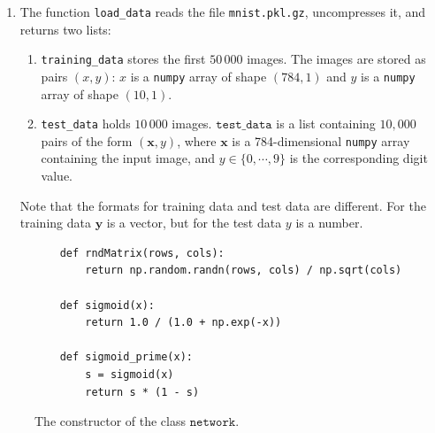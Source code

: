 \begin{enumerate}
      For reasons of efficiency we will only use . 
\item The function \texttt{load\_data} reads the file \texttt{mnist.pkl.gz}, uncompresses it,
      and returns two lists:
      \begin{enumerate}
      \item \texttt{training\_data} stores the first $50\,000$ images.
            The images are stored as pairs $(x,y)$: $x$ is a \texttt{numpy} array of shape $(784,1)$ and $y$ is a
            \texttt{numpy} array of shape $(10, 1)$.
      \item \texttt{test\_data} holds  $10\,000$ images.
            $\texttt{test\_data}$ is a list containing $10,000$  pairs of the form $(\textbf{x}, y)$,
            where $\textbf{x}$ is a 784-dimensional \texttt{numpy} array containing the input image, 
            and $y \in \{0,\cdots,9\}$ is the corresponding digit value.            
      \end{enumerate}
      Note that the formats for training data and test data are different. 
      For the training data $\textbf{y}$ is a vector, but for the test data $y$ is a number.
\end{enumerate}

\begin{figure}[!ht]
\centering
\begin{verbatim}
    def rndMatrix(rows, cols):
        return np.random.randn(rows, cols) / np.sqrt(cols)

    def sigmoid(x):
        return 1.0 / (1.0 + np.exp(-x))    
    
    def sigmoid_prime(x):
        s = sigmoid(x)
        return s * (1 - s)
\end{verbatim}
\vspace*{-0.3cm}
\caption{The constructor of the class $\mathtt{network}$.}
\label{fig:Digit-Regocnition.ipynb-2}
\end{figure}

